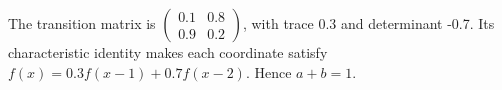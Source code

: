 The transition matrix is $\begin{pmatrix}0.1&0.8\\0.9&0.2\end{pmatrix}$, with trace 0.3 and determinant -0.7. Its characteristic identity makes each coordinate satisfy $f(x)=0.3f(x-1)+0.7f(x-2)$. Hence $a+b=\boxed1$.
